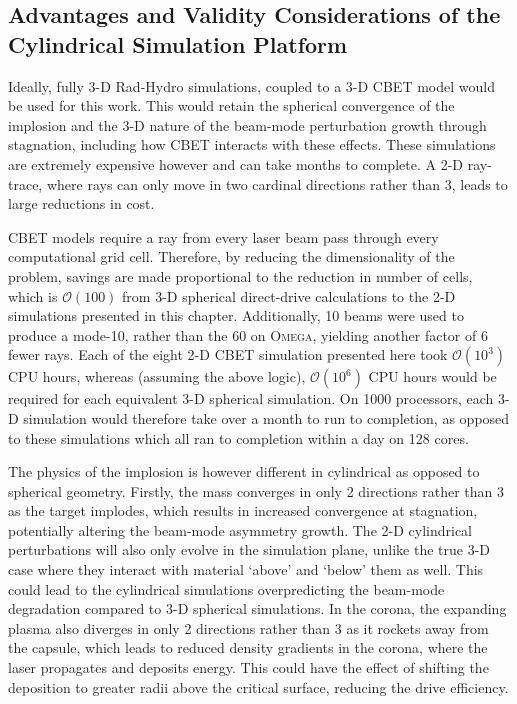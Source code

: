 \subsection{Advantages and Validity Considerations of the Cylindrical Simulation Platform}%
\label{sec:Res1_platformvalidity}

Ideally, fully 3-D \ac{Rad-Hydro} simulations, coupled to a 3-D \ac{CBET} model would be used for this work.
This would retain the spherical convergence of the implosion and the 3-D nature of the beam-mode perturbation growth through stagnation, including how \ac{CBET} interacts with these effects.
These simulations are extremely expensive however and can take months to complete.
A 2-D ray-trace, where rays can only move in two cardinal directions rather than 3, leads to large reductions in cost.

\ac{CBET} models require a ray from every laser beam pass through every computational grid cell.
Therefore, by reducing the dimensionality of the problem, savings are made proportional to the reduction in number of cells, which is $\mathcal{O}(100)$ from 3-D spherical direct-drive calculations to the 2-D simulations presented in this chapter.
Additionally, 10 beams were used to produce a mode-10, rather than the 60 on \textsc{Omega}, yielding another factor of 6 fewer rays.
Each of the eight 2-D \ac{CBET} simulation presented here took $\mathcal{O}(10^3)$ CPU hours, whereas (assuming the above logic), $\mathcal{O}(10^6)$ CPU hours would be required for each equivalent 3-D spherical simulation.
On 1000 processors, each 3-D simulation would therefore take over a month to run to completion, as opposed to these simulations which all ran to completion within a day on 128 cores.

The physics of the implosion is however different in cylindrical as opposed to spherical geometry.
Firstly, the mass converges in only 2 directions rather than 3 as the target implodes, which results in increased convergence at stagnation, potentially altering the beam-mode asymmetry growth.
The 2-D cylindrical perturbations will also only evolve in the simulation plane, unlike the true 3-D case where they interact with material `above' and `below' them as well.
This could lead to the cylindrical simulations overpredicting the beam-mode degradation compared to 3-D spherical simulations.
In the corona, the expanding plasma also diverges in only 2 directions rather than 3 as it rockets away from the capsule, which leads to reduced density gradients in the corona, where the laser propagates and deposits energy.
This could have the effect of shifting the deposition to greater radii above the critical surface, reducing the drive efficiency.

